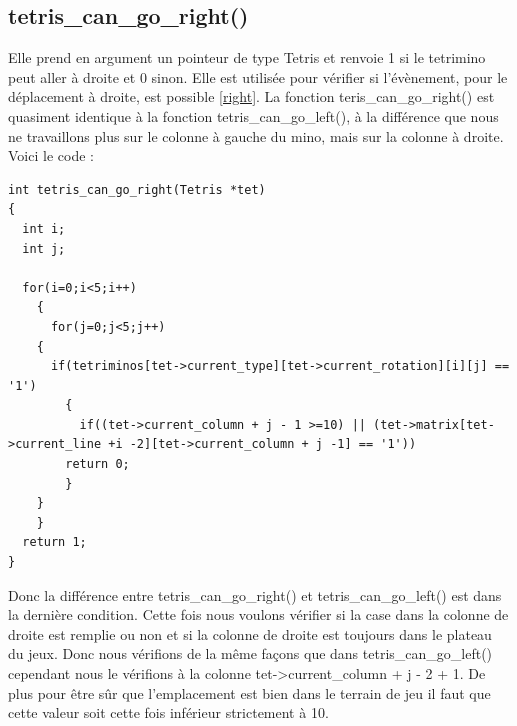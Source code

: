 \documentclass[a4paper,10p]{report}
\begin{document}
\subsection{tetris\_can\_go\_right()}
\label{tetris_can_go_right}
Elle prend en argument un pointeur de type Tetris et renvoie 1 si le tetrimino peut aller à droite et 0 sinon. Elle est utilisée pour vérifier si l'évènement, pour le déplacement à droite, est possible \ref{right}.
La fonction teris\_can\_go\_right() est quasiment identique à la fonction tetris\_can\_go\_left(), à la différence que nous ne travaillons plus sur le colonne à gauche du mino, mais sur la colonne à droite. Voici le code :
\begin{lstlisting}
int tetris_can_go_right(Tetris *tet)
{
  int i;
  int j;

  for(i=0;i<5;i++)
    {
      for(j=0;j<5;j++)
	{
	  if(tetriminos[tet->current_type][tet->current_rotation][i][j] == '1')
	    {
	      if((tet->current_column + j - 1 >=10) || (tet->matrix[tet->current_line +i -2][tet->current_column + j -1] == '1'))
		return 0;
	    }
	}
    }
  return 1;
}
\end{lstlisting}
Donc la différence entre tetris\_can\_go\_right() et tetris\_can\_go\_left() est dans la dernière condition. Cette fois nous voulons vérifier si la case dans la colonne de droite est remplie ou non et si la colonne de droite est toujours dans le plateau du jeux. Donc nous vérifions de la même façons que dans tetris\_can\_go\_left() cependant nous le vérifions à la colonne  tet->current\_column + j - 2 + 1. De plus pour être sûr que l'emplacement est bien dans le terrain de jeu il faut que cette valeur soit cette fois inférieur strictement à 10.
\end{document}
